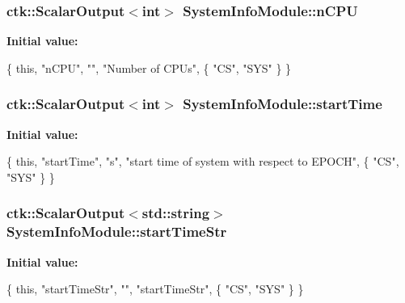 \subsubsection[{\texorpdfstring{n\+C\+PU}{nCPU}}]{\setlength{\rightskip}{0pt plus 5cm}ctk\+::\+Scalar\+Output$<$int$>$ System\+Info\+Module\+::n\+C\+PU}\hypertarget{classSystemInfoModule_a4eb6a36a94e8415db8cf38d8a95354ff}{}\label{classSystemInfoModule_a4eb6a36a94e8415db8cf38d8a95354ff}
{\bfseries Initial value\+:}
\begin{DoxyCode}
\{ \textcolor{keyword}{this}, \textcolor{stringliteral}{"nCPU"}, \textcolor{stringliteral}{""}, \textcolor{stringliteral}{"Number of CPUs"},
    \{ \textcolor{stringliteral}{"CS"}, \textcolor{stringliteral}{"SYS"} \} \}
\end{DoxyCode}
\subsubsection[{\texorpdfstring{start\+Time}{startTime}}]{\setlength{\rightskip}{0pt plus 5cm}ctk\+::\+Scalar\+Output$<$int$>$ System\+Info\+Module\+::start\+Time}\hypertarget{classSystemInfoModule_a9caec7b46d3c1a9b39407592ab4858d1}{}\label{classSystemInfoModule_a9caec7b46d3c1a9b39407592ab4858d1}
{\bfseries Initial value\+:}
\begin{DoxyCode}
\{ \textcolor{keyword}{this}, \textcolor{stringliteral}{"startTime"}, \textcolor{stringliteral}{"s"}, \textcolor{stringliteral}{"start time of system with respect to EPOCH"},
      \{ \textcolor{stringliteral}{"CS"}, \textcolor{stringliteral}{"SYS"} \} \}
\end{DoxyCode}
\subsubsection[{\texorpdfstring{start\+Time\+Str}{startTimeStr}}]{\setlength{\rightskip}{0pt plus 5cm}ctk\+::\+Scalar\+Output$<$std\+::string$>$ System\+Info\+Module\+::start\+Time\+Str}\hypertarget{classSystemInfoModule_ad924ec0d32245d1426556770918c9f55}{}\label{classSystemInfoModule_ad924ec0d32245d1426556770918c9f55}
{\bfseries Initial value\+:}
\begin{DoxyCode}
\{ \textcolor{keyword}{this}, \textcolor{stringliteral}{"startTimeStr"}, \textcolor{stringliteral}{""}, \textcolor{stringliteral}{"startTimeStr"},
        \{ \textcolor{stringliteral}{"CS"}, \textcolor{stringliteral}{"SYS"} \} \}
\end{DoxyCode}
